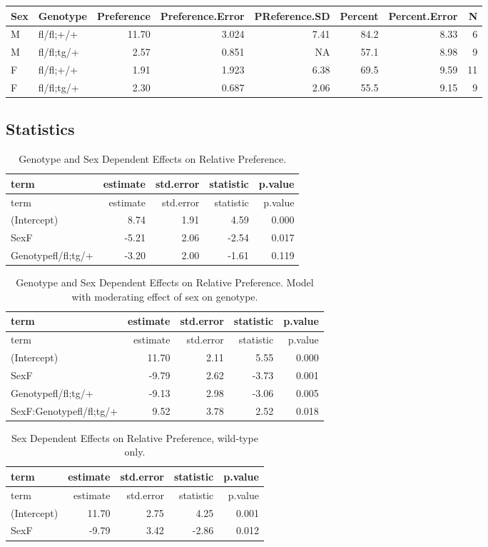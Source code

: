 \documentclass[]{article}
\begin{document}
\begin{longtable}[]{@{}llrrrrrr@{}}
\toprule
Sex & Genotype & Preference & Preference.Error & PReference.SD & Percent
& Percent.Error & N\tabularnewline
\midrule
\endhead
M & fl/fl;+/+ & 11.70 & 3.024 & 7.41 & 84.2 & 8.33 & 6\tabularnewline
M & fl/fl;tg/+ & 2.57 & 0.851 & NA & 57.1 & 8.98 & 9\tabularnewline
F & fl/fl;+/+ & 1.91 & 1.923 & 6.38 & 69.5 & 9.59 & 11\tabularnewline
F & fl/fl;tg/+ & 2.30 & 0.687 & 2.06 & 55.5 & 9.15 & 9\tabularnewline
\bottomrule
\end{longtable}

\hypertarget{statistics}{%
\subsection{Statistics}\label{statistics}}

\begin{longtable}[]{@{}lrrrr@{}}
\caption{Genotype and Sex Dependent Effects on Relative
Preference.}\tabularnewline
\toprule
term & estimate & std.error & statistic & p.value\tabularnewline
\midrule
\endfirsthead
\toprule
term & estimate & std.error & statistic & p.value\tabularnewline
\midrule
\endhead
(Intercept) & 8.74 & 1.91 & 4.59 & 0.000\tabularnewline
SexF & -5.21 & 2.06 & -2.54 & 0.017\tabularnewline
Genotypefl/fl;tg/+ & -3.20 & 2.00 & -1.61 & 0.119\tabularnewline
\bottomrule
\end{longtable}

\begin{longtable}[]{@{}lrrrr@{}}
\caption{Genotype and Sex Dependent Effects on Relative Preference.
Model with moderating effect of sex on genotype.}\tabularnewline
\toprule
term & estimate & std.error & statistic & p.value\tabularnewline
\midrule
\endfirsthead
\toprule
term & estimate & std.error & statistic & p.value\tabularnewline
\midrule
\endhead
(Intercept) & 11.70 & 2.11 & 5.55 & 0.000\tabularnewline
SexF & -9.79 & 2.62 & -3.73 & 0.001\tabularnewline
Genotypefl/fl;tg/+ & -9.13 & 2.98 & -3.06 & 0.005\tabularnewline
SexF:Genotypefl/fl;tg/+ & 9.52 & 3.78 & 2.52 & 0.018\tabularnewline
\bottomrule
\end{longtable}

\begin{longtable}[]{@{}lrrrr@{}}
\caption{Sex Dependent Effects on Relative Preference, wild-type
only.}\tabularnewline
\toprule
term & estimate & std.error & statistic & p.value\tabularnewline
\midrule
\endfirsthead
\toprule
term & estimate & std.error & statistic & p.value\tabularnewline
\midrule
\endhead
(Intercept) & 11.70 & 2.75 & 4.25 & 0.001\tabularnewline
SexF & -9.79 & 3.42 & -2.86 & 0.012\tabularnewline
\bottomrule
\end{longtable}
\end{document}
